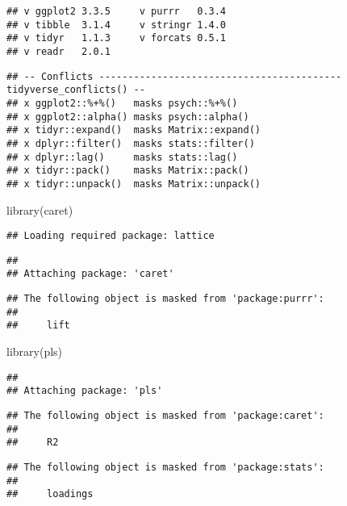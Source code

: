 \documentclass[
]{article}
\newenvironment{Shaded}{\begin{snugshade}}{\end{snugshade}}
\newcommand{\FunctionTok}[1]{\textcolor[rgb]{0.00,0.00,0.00}{#1}}
\newcommand{\NormalTok}[1]{#1}
\begin{document}
\begin{verbatim}
## v ggplot2 3.3.5     v purrr   0.3.4
## v tibble  3.1.4     v stringr 1.4.0
## v tidyr   1.1.3     v forcats 0.5.1
## v readr   2.0.1
\end{verbatim}

\begin{verbatim}
## -- Conflicts ------------------------------------------ tidyverse_conflicts() --
## x ggplot2::%+%()   masks psych::%+%()
## x ggplot2::alpha() masks psych::alpha()
## x tidyr::expand()  masks Matrix::expand()
## x dplyr::filter()  masks stats::filter()
## x dplyr::lag()     masks stats::lag()
## x tidyr::pack()    masks Matrix::pack()
## x tidyr::unpack()  masks Matrix::unpack()
\end{verbatim}

\begin{Shaded}
\begin{Highlighting}[]
\FunctionTok{library}\NormalTok{(caret)}
\end{Highlighting}
\end{Shaded}

\begin{verbatim}
## Loading required package: lattice
\end{verbatim}

\begin{verbatim}
## 
## Attaching package: 'caret'
\end{verbatim}

\begin{verbatim}
## The following object is masked from 'package:purrr':
## 
##     lift
\end{verbatim}

\begin{Shaded}
\begin{Highlighting}[]
\FunctionTok{library}\NormalTok{(pls)}
\end{Highlighting}
\end{Shaded}

\begin{verbatim}
## 
## Attaching package: 'pls'
\end{verbatim}

\begin{verbatim}
## The following object is masked from 'package:caret':
## 
##     R2
\end{verbatim}

\begin{verbatim}
## The following object is masked from 'package:stats':
## 
##     loadings
\end{verbatim}
\end{document}
